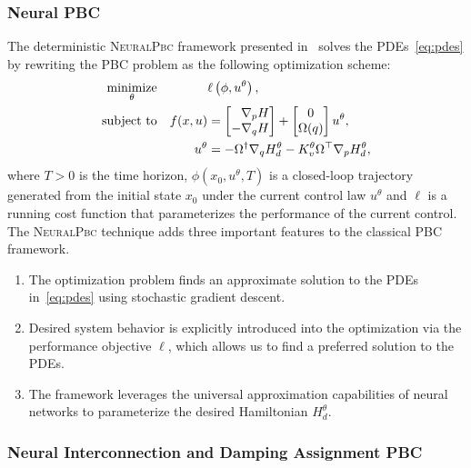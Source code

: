 \subsubsection{Neural PBC}

The deterministic \textsc{NeuralPbc} framework presented in~\cite{ashenafi2022robust}
solves the PDEs~\eqref{eq:pdes} by rewriting the PBC problem as the following 
optimization scheme:
\begin{equation}
  \begin{aligned}
      \underset{\theta}{\textrm{minimize}} 
      & & & \ell \left(\phi,u^{\theta} \right) , \\%
      \textrm{subject to}
      & & f(x, u) &= \bmat{\phantom{-}\nabla_p H \\ -\nabla_q H} + \bmat{0 \\ \Omega(q)}u^{\theta}, \\%
      & & u^{\theta} &= -\Omega^{\dagger} \nabla_q H_d^{\theta} - K_v^{\theta} \Omega^\top \nabla_p H_d^{\theta},%
  \end{aligned}
  \label{eq:neural_pbc_finite_optim}
\end{equation}
where $T>0$ is the time horizon, $\phi( x_0, u^\theta, T)$ is a closed-loop
trajectory generated from the initial state $x_0$ under the current control law
$u^\theta$ and $\ell$ is a running cost function that parameterizes the
performance of the current control.
%
The \textsc{NeuralPbc} technique adds three important features to the classical 
PBC framework.
\begin{enumerate}
  \item The optimization problem finds an approximate solution to the PDEs
  in~\eqref{eq:pdes} using stochastic gradient descent.
  \item Desired system behavior is explicitly introduced into the optimization
      via the performance objective $\ell$, which allows us to find a
      preferred solution to the PDEs.
  \item The framework leverages the universal approximation capabilities of
  neural networks to parameterize the desired Hamiltonian $H^\theta_d$.
\end{enumerate}

\subsubsection{Neural Interconnection and Damping Assignment PBC}

